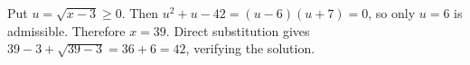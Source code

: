 Put $u=\sqrt{x-3}\ge0$. Then $u^2+u-42=(u-6)(u+7)=0$, so only $u=6$ is admissible. Therefore $\boxed{x=39}$. Direct substitution gives $39-3+\sqrt{39-3}=36+6=42$, verifying the solution.
